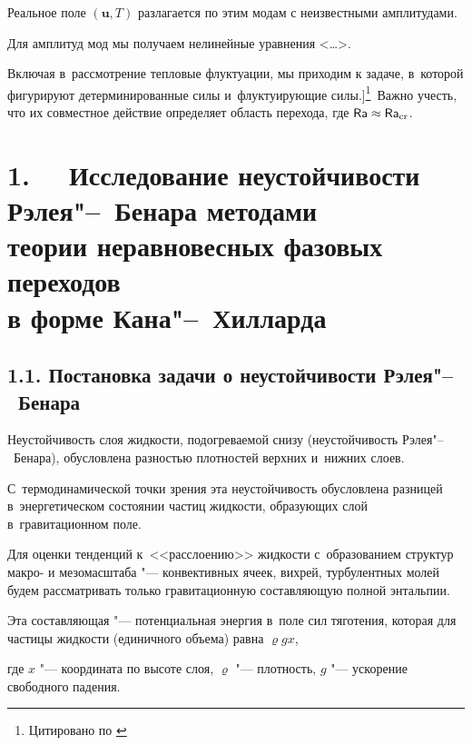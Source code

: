 Реальное поле $({\boldsymbol u}, T)$ разлагается по этим модам с неизвестными амплитудами. 

Для амплитуд мод мы получаем нелинейные уравнения <\dots>. 

Включая в~рассмотрение тепловые флуктуации, мы приходим к задаче, в~которой фигурируют детерминированные силы и~флуктуирующие силы.]\footnote{Цитировано по \cite[c.~287]{lukashev:bib29}}~\!\!Важно учесть, что их совместное действие определяет область перехода, где $\mathsf{Ra} \approx \mathsf{Ra}_{\rm cr}$.







\section*{\large 1.~~ Исследование неустойчивости Рэлея"--~Бенара методами \\ \phantom{1.~~} теории неравновесных фазовых переходов \\ \phantom{1.~~} в форме Кана"--~Хилларда}





\subsection*{\normalsize 1.1. Постановка задачи о неустойчивости Рэлея"--~Бенара}



\indent 



Неустойчивость слоя жидкости, подогреваемой снизу (неустойчивость Рэлея"--~Бенара), обусловлена разностью плотностей верхних и~нижних слоев. 

С~термодинамической точки зрения эта неустойчивость обусловлена разницей в~энергетическом состоянии частиц жидкости, образующих слой в~гравитационном поле. 

Для оценки тенденций к~<<расслоению>> жидкости с~образованием структур макро- и мезомасштаба "--- конвективных ячеек, вихрей, турбулентных молей будем рассматривать только гравитационную составляющую полной энтальпии. 

Эта составляющая "--- потенциальная энергия в~поле сил тяготения, которая для частицы жидкости (единичного объема) равна  $\varrho g x$, 

где $x$ "--- координата по высоте слоя,  $\varrho$ "--- плотность, $g$ "--- ускорение свободного падения.



